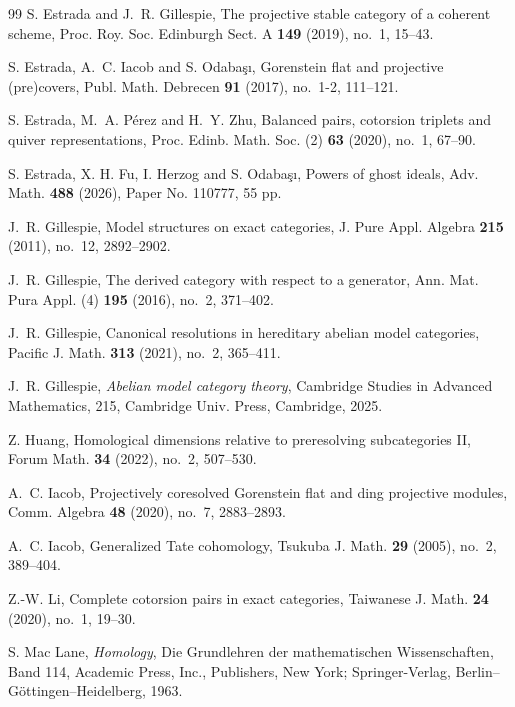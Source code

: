 \documentclass[reqno,12pt]{amsart}
\numberwithin{equation}{section}
\theoremstyle{plain}
\theoremstyle{definition}
\begin{document}
\begin{thebibliography}{99}
 S. Estrada and J.~R. Gillespie, The projective stable category of a coherent scheme, Proc. Roy. Soc. Edinburgh Sect. A {\bf 149} (2019), no.~1, 15--43.

 S. Estrada, A.~C. Iacob and S. Odaba\c s\i, Gorenstein flat and projective (pre)covers, Publ. Math. Debrecen {\bf 91} (2017), no.~1-2, 111--121.

 S. Estrada, M.~A. P\'erez and H.~Y. Zhu, Balanced pairs, cotorsion triplets and quiver representations, Proc. Edinb. Math. Soc. (2) {\bf 63} (2020), no.~1, 67--90.

 S. Estrada, X. H. Fu, I. Herzog and S. Odaba\c s\i, Powers of ghost ideals, Adv. Math. {\bf 488} (2026), Paper No. 110777, 55 pp.


 J.~R. Gillespie, Model structures on exact categories, J. Pure Appl. Algebra {\bf 215} (2011), no.~12, 2892--2902.

 J.~R. Gillespie, The derived category with respect to a generator, Ann. Mat. Pura Appl. (4) {\bf 195} (2016), no.~2, 371--402.

 J.~R. Gillespie, Canonical resolutions in hereditary abelian model categories, Pacific J. Math. {\bf 313} (2021), no.~2, 365--411.

 J.~R. Gillespie, {\it Abelian model category theory}, Cambridge Studies in Advanced Mathematics, 215, Cambridge Univ. Press, Cambridge, 2025.

 Z. Huang, Homological dimensions relative to preresolving subcategories II, Forum Math. {\bf 34} (2022), no.~2, 507--530.

 A.~C. Iacob, Projectively coresolved Gorenstein flat and ding projective modules, Comm. Algebra {\bf 48} (2020), no.~7, 2883--2893.

 A.~C. Iacob, Generalized Tate cohomology, Tsukuba J. Math. {\bf 29} (2005), no.~2, 389--404.


 Z.-W. Li, Complete cotorsion pairs in exact categories, Taiwanese J. Math. {\bf 24} (2020), no.~1, 19--30.

 S. Mac Lane, {\it Homology}, Die Grundlehren der mathematischen Wissenschaften,
Band 114, Academic Press, Inc., Publishers, New York; Springer-Verlag,
Berlin--Göttingen--Heidelberg, 1963.


\end{thebibliography}
\end{document}
